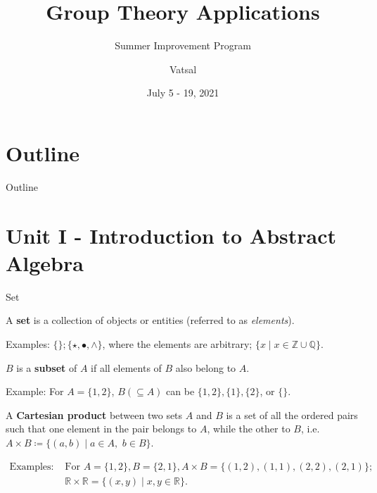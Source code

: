 \documentclass{beamer}
\title{Group Theory Applications}
\subtitle{Summer Improvement Program}
\author{Vatsal}
\institute[IIT Bombay]{Department of Chemistry \\
Indian Institute of Technology Bombay}
\date{July 5 - 19, 2021}
\newcommand\boldtext[1]{\textcolor{bolds}{\textbf{#1}}}
\newcommand\italictext[1]{\textcolor{italics}{\textit{#1}}}
\begin{document}
\begin{frame}
\titlepage
\end{frame}

\section*{Outline}
\begin{frame}{Outline}
    \tableofcontents
\end{frame}

\section{Unit I - Introduction to Abstract Algebra}

\begin{frame}{Set}
    \begin{definition}
        A \boldtext{set} is a collection of objects or entities (referred to as \italictext{elements}).
    \end{definition}
    Examples: $\{\}; \{\star,\bullet,\wedge\}$, where the elements are arbitrary; $\{x \mid x \in \mathbb{Z}\cup\mathbb{Q}\}$. 
    \begin{definition}
        $B$ is a \boldtext{subset} of $A$ if all elements of $B$ also belong to $A$.
    \end{definition}
    Example: For $A=\{1,2\}$, $B (\subseteq A)$ can be $\{1,2\},\{1\},\{2\}$, or $\{\}$.
    \begin{definition}
        A \boldtext{Cartesian product} between two sets $A$ and $B$ is a set of all the ordered pairs such that one element in the pair belongs to $A$, while the other to $B$, i.e. $A\times B\coloneqq\{(a,b)\mid a\in A,$ $b\in B\}$.
    \end{definition}
    \begin{align*}
        \text{Examples: } & \text{For $A=\{1,2\},B=\{2,1\},A\times B=\{(1,2),(1,1),(2,2),(2,1)\}$;}\\ & \text{$\mathbb{R}\times\mathbb{R}=\{(x,y)\mid x,y\in\mathbb{R}\}$}.
    \end{align*}
\end{frame}
\end{document}
